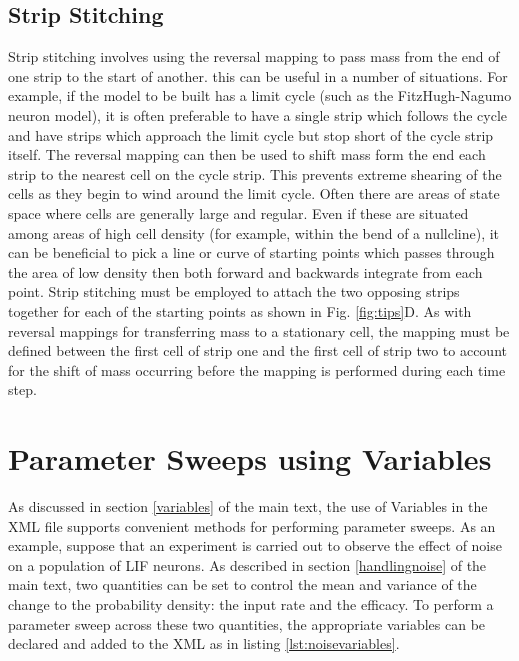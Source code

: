 \documentclass[utf8]{frontiers_suppmat} %
\begin{document}
\subsection{Strip Stitching}
Strip stitching involves using the reversal mapping to pass mass from the end of one strip to the start of another. this can be useful in a number of situations. For example, if the model to be built has a limit cycle (such as the FitzHugh-Nagumo neuron model), it is often preferable to have a single strip which follows the cycle and have strips which approach the limit cycle but stop short of the cycle strip itself. The reversal mapping can then be used to shift mass form the end each strip to the nearest cell on the cycle strip. This prevents extreme shearing of the cells as they begin to wind around the limit cycle. 
Often there are areas of state space where cells are generally large and regular. Even if these are situated among areas of high cell density (for example, within the bend of a nullcline), it can be beneficial to pick a line or curve of starting points which passes through the area of low density then both forward and backwards integrate from each point. Strip stitching must be employed to attach the two opposing strips together for each of the starting points as shown in Fig. \ref{fig:tips}D. 
As with reversal mappings for transferring mass to a stationary cell, the mapping must be defined between the first cell of strip one and the first cell of strip two to account for the shift of mass occurring before the mapping is performed during each time step.

\section{Parameter Sweeps using Variables}
\label{parametersweeps}
As discussed in section \ref{variables} of the main text, the use of Variables in the XML file supports convenient methods for performing parameter sweeps. As an example, suppose that an experiment is carried out to observe the effect of noise on a population of LIF neurons. As described in section \ref{handlingnoise} of the main text, two quantities can be set to control the mean and variance of the change to the probability density: the input rate and the efficacy. To perform a parameter sweep across these two quantities, the appropriate variables can be declared and added to the XML as in listing \ref{lst:noisevariables}.
\end{document}
